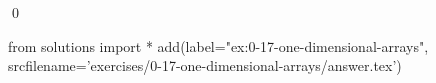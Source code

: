
\begin{ex}
  \label{ex:0-17-one-dimensional-arrays}
  
  \qed
\end{ex}
\begin{python0}
from solutions import *
add(label="ex:0-17-one-dimensional-arrays",
    srcfilename='exercises/0-17-one-dimensional-arrays/answer.tex')
\end{python0}
